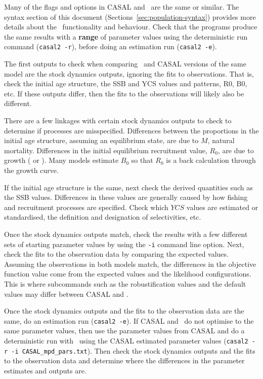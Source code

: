 Many of the flags and options in CASAL and \CNAME\ are the same or similar. The syntax section of this document (Sections~\ref{sec:population-syntax}) provides more details about the \CNAME\ functionality and behaviour. Check that the programs produce the same results with a \textbf{range} of parameter values using the deterministic run command (\texttt{casal2 -r}), before doing an estimation run (\texttt{casal2 -e}).

The first outputs to check when comparing \CNAME\ and CASAL versions of the same model are the stock dynamics outputs, ignoring the fits to observations. That is, check the initial age structure, the SSB and YCS values and patterns, R0, B0, etc. If these outputs differ, then the fits to the observations will likely also be different.

There are a few linkages with certain stock dynamics outputs to check to determine if processes are misspecified. Differences between the proportions in the initial age structure, assuming an equilibrium state, are due to $M$, natural mortality. Differences in the initial equilibrium recruitment value, $R_0$, are due to growth ( or ). Many models estimate $B_0$ so that $R_0$ is a back calculation through the growth curve.

If the initial age structure is the same, next check the derived quantities such as the SSB values. Differences in these values are generally caused by how fishing and recruitment processes are specified. Check which $YCS$ values are estimated or standardised, the definition and designation of selectivities, etc.

Once the stock dynamics outputs match, check the results with a few different sets of starting parameter values by using the \texttt{-i} command line option. Next, check the fits to the observation data by comparing the expected values.  Assuming the observations in both models match, the differences in the objective function value come from the expected values and the likelihood configurations. This is where subcommands such as the robustification values and the default values may differ between CASAL and \CNAME.

Once the stock dynamics outputs and the fits to the observation data are the same, do an estimation run (\texttt{casal2 -e}). If CASAL and \CNAME\ do not optimise to the same parameter values, then use the parameter values from CASAL and do a deterministic run with \CNAME\ using the CASAL estimated parameter values (\texttt{casal2 -r -i CASAL\_mpd\_pars.txt}). Then check the stock dynamics outputs and the fits to the observation data and determine where the differences in the parameter estimates and outputs are.

